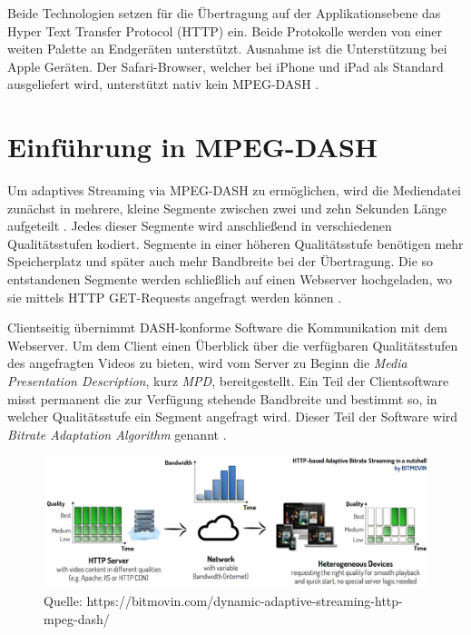 \documentclass[paper = a4, fontsize = 12pt, parskip = half]{scrartcl} %
\begin{document}
Beide Technologien setzen für die Übertragung auf der Applikationsebene das Hyper Text Transfer Protocol (HTTP) ein. Beide Protokolle werden von einer weiten Palette an Endgeräten unterstützt. Ausnahme ist die Unterstützung bei Apple Geräten. Der Safari-Browser, welcher bei iPhone und iPad als Standard ausgeliefert wird, unterstützt nativ kein MPEG-DASH \cite{timmerer_live_2015} .

\section{Einführung in MPEG-DASH}
Um adaptives Streaming via MPEG-DASH zu ermöglichen, wird die Mediendatei zunächst in mehrere, kleine Segmente zwischen zwei und zehn Sekunden Länge aufgeteilt \cite{international_organization_for_standardization_isoiec_nodate}. Jedes dieser Segmente wird anschließend in verschiedenen Qualitätsstufen kodiert. Segmente in einer höheren Qualitätsstufe benötigen mehr Speicherplatz und später auch mehr Bandbreite bei der Übertragung. Die so entstandenen Segmente werden schließlich auf einen Webserver hochgeladen, wo sie mittels HTTP GET-Requests angefragt werden können \cite{sodagar_mpeg-dash_2011}. 

Clientseitig übernimmt DASH-konforme Software die Kommunikation mit dem Webserver. Um dem Client einen Überblick über die verfügbaren Qualitätsstufen des angefragten Videos zu bieten, wird vom Server zu Beginn die \textit{Media Presentation Description}, kurz \textit{MPD}, bereitgestellt. Ein Teil der Clientsoftware misst permanent die zur Verfügung stehende Bandbreite und bestimmt so, in welcher Qualitätsstufe ein Segment angefragt wird. Dieser Teil der Software wird \textit{Bitrate Adaptation Algorithm} genannt \cite{bentaleb_survey_2019}. 

	\begin{figure}
		\centering
		\includegraphics[width=14cm]{images/adaptive-streaming-basic.png}
		\caption{Quelle: https://bitmovin.com/dynamic-adaptive-streaming-http-mpeg-dash/}
	\end{figure}
\end{document}
